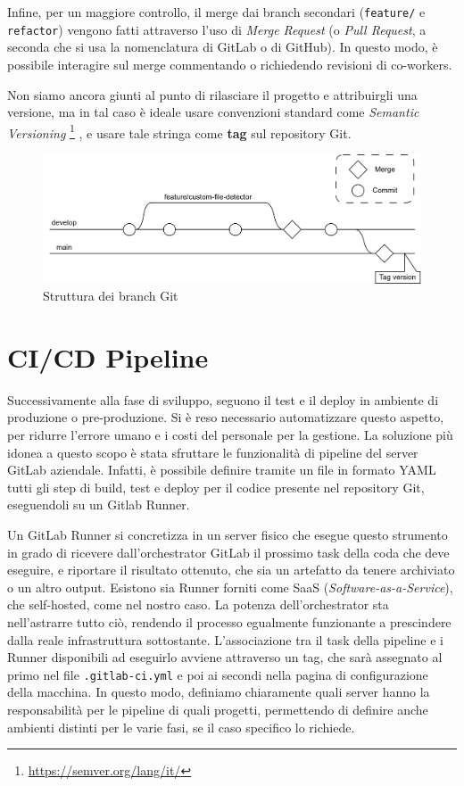 Infine, per un maggiore controllo, il merge dai branch secondari (\texttt{feature/} e \texttt{refactor}) vengono fatti attraverso l'uso di \emph{Merge Request} (o \emph{Pull Request}, a seconda che si usa la nomenclatura di GitLab o di GitHub).
In questo modo, è possibile interagire sul merge commentando o richiedendo revisioni di co-workers.

Non siamo ancora giunti al punto di rilasciare il progetto e attribuirgli una versione, ma in tal caso è ideale usare convenzioni standard come \emph{Semantic Versioning}
\footnote{\url{https://semver.org/lang/it/}}
, e usare tale stringa come \textbf{tag} sul repository Git.

\begin{figure}[h!]
    \centering
    \includegraphics[width=\textwidth]{assets/git_branches_diagram.png}
    \caption{Struttura dei branch Git}
    \label{fig:git_branches_diagram}
\end{figure}

\section{CI/CD Pipeline}
Successivamente alla fase di sviluppo, seguono il test e il deploy in ambiente di produzione o pre-produzione.
Si è reso necessario automatizzare questo aspetto, per ridurre l'errore umano e i costi del personale per la gestione.
La soluzione più idonea a questo scopo è stata sfruttare le funzionalità di pipeline del server GitLab aziendale. Infatti, è possibile definire tramite un file in formato YAML tutti gli step di build, test e deploy per il codice presente nel repository Git, eseguendoli su un Gitlab Runner.

Un GitLab Runner si concretizza in un server fisico che esegue questo strumento in grado di ricevere dall'orchestrator GitLab il prossimo task della coda che deve eseguire, e riportare il risultato ottenuto, che sia un artefatto da tenere archiviato o un altro output. Esistono sia Runner forniti come SaaS (\emph{Software-as-a-Service}), che self-hosted, come nel nostro caso. La potenza dell'orchestrator sta nell'astrarre tutto ciò, rendendo il processo egualmente funzionante a prescindere dalla reale infrastruttura sottostante.
L'associazione tra il task della pipeline e i Runner disponibili ad eseguirlo avviene attraverso un tag, che sarà assegnato al primo nel file \texttt{.gitlab-ci.yml} e poi ai secondi nella pagina di configurazione della macchina.
In questo modo, definiamo chiaramente quali server hanno la responsabilità per le pipeline di quali progetti, permettendo di definire anche ambienti distinti per le varie fasi, se il caso specifico lo richiede.

